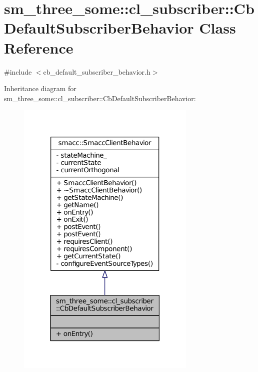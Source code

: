 \hypertarget{classsm__three__some_1_1cl__subscriber_1_1CbDefaultSubscriberBehavior}{}\section{sm\+\_\+three\+\_\+some\+:\+:cl\+\_\+subscriber\+:\+:Cb\+Default\+Subscriber\+Behavior Class Reference}
\label{classsm__three__some_1_1cl__subscriber_1_1CbDefaultSubscriberBehavior}


{\ttfamily \#include $<$cb\+\_\+default\+\_\+subscriber\+\_\+behavior.\+h$>$}



Inheritance diagram for sm\+\_\+three\+\_\+some\+:\+:cl\+\_\+subscriber\+:\+:Cb\+Default\+Subscriber\+Behavior\+:
\nopagebreak
\begin{figure}[H]
\begin{center}
\leavevmode
\includegraphics[width=243pt]{classsm__three__some_1_1cl__subscriber_1_1CbDefaultSubscriberBehavior__inherit__graph}
\end{center}
\end{figure}


